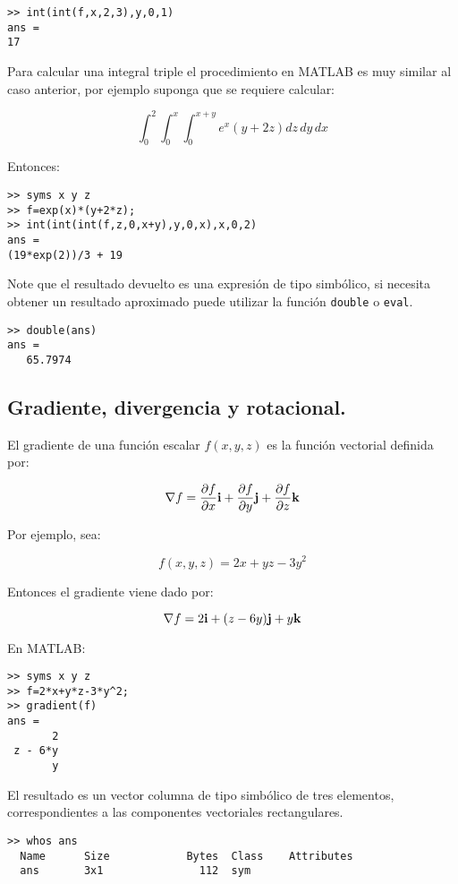 \begin{verbatim}
>> int(int(f,x,2,3),y,0,1)
ans =
17
\end{verbatim}

Para calcular una integral triple el procedimiento en MATLAB es muy similar al caso anterior, por ejemplo 
suponga que se requiere calcular:

$$\int_0^2 \int_0^x \int_0^{x+y} e^{x}\left(y+2z\right) dz \, dy \, dx$$

Entonces:

\begin{verbatim}
>> syms x y z
>> f=exp(x)*(y+2*z);
>> int(int(int(f,z,0,x+y),y,0,x),x,0,2)
ans =
(19*exp(2))/3 + 19
\end{verbatim}

Note que el resultado devuelto es una expresión de tipo simbólico, si necesita obtener un resultado 
aproximado puede utilizar la función {\tt double} o {\tt eval}.

\begin{verbatim}
>> double(ans)
ans =
   65.7974
\end{verbatim}

\subsection{Gradiente, divergencia y rotacional.}

El gradiente  de una función escalar $f(x,y,z)$ es la función vectorial definida por:

$$\nabla f = \frac{\partial f}{\partial x} {\bf i}+ \frac{\partial f}{\partial y} {\bf j}+ 
\frac{\partial f}{\partial z} {\bf k}$$

Por ejemplo, sea:

$$f(x,y,z)=2x+yz-3y^2$$

Entonces el gradiente viene dado por:

$$\nabla f = 2 {\bf i} + (z-6y) {\bf j} + y {\bf k} $$

En MATLAB:

\begin{verbatim}
>> syms x y z
>> f=2*x+y*z-3*y^2; 
>> gradient(f)
ans =
       2
 z - 6*y
       y
\end{verbatim}

El resultado es un vector columna de tipo simbólico de tres elementos, correspondientes a las 
componentes vectoriales rectangulares.

\begin{verbatim}
>> whos ans
  Name      Size            Bytes  Class    Attributes
  ans       3x1               112  sym                
\end{verbatim}


